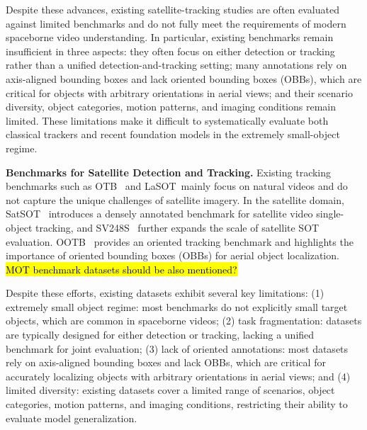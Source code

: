 \documentclass{article}
\begin{document}
Despite these advances, existing satellite-tracking studies are often evaluated
against limited benchmarks and do not fully meet the requirements of modern
spaceborne video understanding. In particular, existing benchmarks remain
insufficient in three aspects: they often focus on either detection or tracking
rather than a unified detection-and-tracking setting; many annotations rely on
axis-aligned bounding boxes and lack oriented bounding boxes (OBBs), which are
critical for objects with arbitrary orientations in aerial views; and their
scenario diversity, object categories, motion patterns, and imaging conditions
remain limited. These limitations make it difficult to systematically evaluate
both classical trackers and recent foundation models in the extremely
small-object regime.

\noindent\textbf{Benchmarks for Satellite Detection and Tracking.} Existing
tracking benchmarks such as OTB~\citep{wu2013otb} and
LaSOT~\citep{fan2019lasot}mainly focus on natural videos and do not capture the
unique challenges of satellite imagery. In the satellite domain,
SatSOT~\citep{satSOT2022} introduces a densely annotated benchmark for satellite
video single-object tracking, and SV248S~\citep{Li2022SV248S} further expands
the scale of satellite SOT evaluation. OOTB~\citep{CHEN2024212ootb} provides an
oriented tracking benchmark and highlights the importance of oriented bounding
boxes (OBBs) for aerial object localization. \hl{MOT benchmark datasets should be also mentioned?}

Despite these efforts, existing datasets exhibit several key limitations: (1)
extremely small object regime: most benchmarks do not explicitly small target
objects, which are common in spaceborne videos; (2) task fragmentation: datasets
are typically designed for either detection or tracking, lacking a unified
benchmark for joint evaluation; (3) lack of oriented annotations: most datasets
rely on axis-aligned bounding boxes and lack OBBs,
which are critical for accurately localizing objects with arbitrary orientations
in aerial views; and (4) limited diversity: existing datasets cover a limited
range of scenarios, object categories, motion patterns, and imaging conditions,
restricting their ability to evaluate model generalization.
\end{document}
